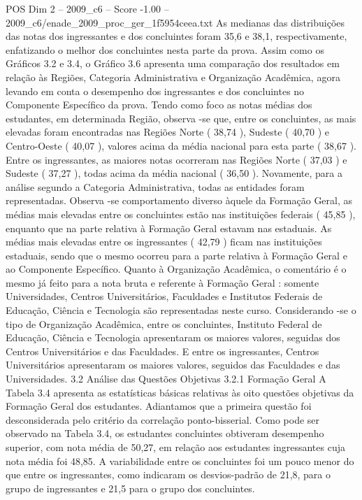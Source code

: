 \begin{textsample}{POS Dim 2 – 2009\_c6 – Score -1.00 – 2009\_c6/enade\_2009\_proc\_ger\_1f5954ceea.txt}
As medianas das distribuições das notas dos ingressantes e dos concluintes foram 35,6 e 38,1, respectivamente, enfatizando o melhor dos concluintes nesta parte da prova.
Assim como os Gráficos 3.2 e 3.4, o Gráfico 3.6 apresenta uma comparação dos resultados em relação às Regiões, Categoria Administrativa e Organização Acadêmica, agora levando em conta o desempenho dos ingressantes e dos concluintes no Componente Específico da prova.
Tendo como foco as notas médias dos estudantes, em determinada Região, observa -se que, entre os concluintes, as mais elevadas foram encontradas nas Regiões Norte ( 38,74 ), Sudeste ( 40,70 ) e Centro-Oeste ( 40,07 ), valores acima da média nacional para esta parte ( 38,67 ).
Entre os ingressantes, as maiores notas ocorreram nas Regiões Norte ( 37,03 ) e Sudeste ( 37,27 ), todas acima da média nacional ( 36,50 ).
Novamente, para a análise segundo a Categoria Administrativa, todas as entidades foram representadas.
Observa -se comportamento diverso àquele da Formação Geral, as médias mais elevadas entre os concluintes estão nas instituições federais ( 45,85 ), enquanto que na parte relativa à Formação Geral estavam nas estaduais.
As médias mais elevadas entre os ingressantes ( 42,79 ) ficam nas instituições estaduais, sendo que o mesmo ocorreu para a parte relativa à Formação Geral e ao Componente Específico.
Quanto à Organização Acadêmica, o comentário é o mesmo já feito para a nota bruta e referente à Formação Geral : somente Universidades, Centros Universitários, Faculdades e Institutos Federais de Educação, Ciência e Tecnologia são representadas neste curso.
Considerando -se o tipo de Organização Acadêmica, entre os concluintes, Instituto Federal de Educação, Ciência e Tecnologia apresentaram os maiores valores, seguidas dos Centros Universitários e das Faculdades.
E entre os ingressantes, Centros Universitários apresentaram os maiores valores, seguidos das Faculdades e das Universidades. 3.2 Análise das Questões Objetivas 3.2.1 Formação Geral A Tabela 3.4 apresenta as estatísticas básicas relativas às oito questões objetivas da Formação Geral dos estudantes.
Adiantamos que a primeira questão foi desconsiderada pelo critério da correlação ponto-bisserial.
Como pode ser observado na Tabela 3.4, os estudantes concluintes obtiveram desempenho superior, com nota média de 50,27, em relação aos estudantes ingressantes cuja nota média foi 48,85.
A variabilidade entre os concluintes foi um pouco menor do que entre os ingressantes, como indicaram os desvios-padrão de 21,8, para o grupo de ingressantes e 21,5 para o grupo dos concluintes.

\end{textsample}
